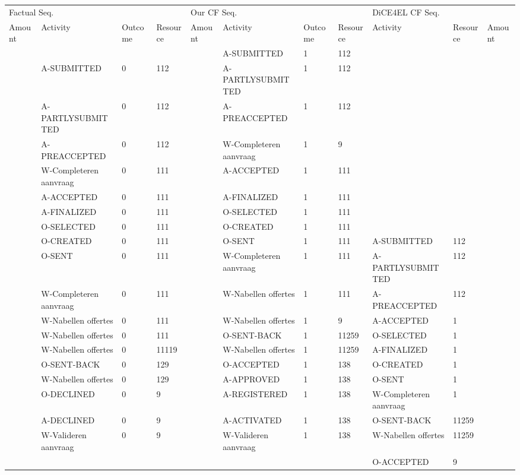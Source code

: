 \begin{tabular}{lllllllllll}
\toprule
\multicolumn{4}{l}{Factual Seq.} & \multicolumn{4}{l}{Our CF Seq.} & \multicolumn{3}{l}{DiCE4EL CF Seq.} \\
Amount & Activity & Outcome & Resource & Amount & Activity & Outcome & Resource & Activity & Resource & Amount \\
\midrule
 &  &  &  &  & A-SUBMITTED & 1 & 112 &  &  &  \\
 & A-SUBMITTED & 0 & 112 &  & A-PARTLYSUBMITTED & 1 & 112 &  &  &  \\
 & A-PARTLYSUBMITTED & 0 & 112 &  & A-PREACCEPTED & 1 & 112 &  &  &  \\
 & A-PREACCEPTED & 0 & 112 &  & W-Completeren aanvraag & 1 & 9 &  &  &  \\
 & W-Completeren aanvraag & 0 & 111 &  & A-ACCEPTED & 1 & 111 &  &  &  \\
 & A-ACCEPTED & 0 & 111 &  & A-FINALIZED & 1 & 111 &  &  &  \\
 & A-FINALIZED & 0 & 111 &  & O-SELECTED & 1 & 111 &  &  &  \\
 & O-SELECTED & 0 & 111 &  & O-CREATED & 1 & 111 &  &  &  \\
 & O-CREATED & 0 & 111 &  & O-SENT & 1 & 111 & A-SUBMITTED & 112 &  \\
 & O-SENT & 0 & 111 &  & W-Completeren aanvraag & 1 & 111 & A-PARTLYSUBMITTED & 112 &  \\
 & W-Completeren aanvraag & 0 & 111 &  & W-Nabellen offertes & 1 & 111 & A-PREACCEPTED & 112 &  \\
 & W-Nabellen offertes & 0 & 111 &  & W-Nabellen offertes & 1 & 9 & A-ACCEPTED & 1 &  \\
 & W-Nabellen offertes & 0 & 111 &  & O-SENT-BACK & 1 & 11259 & O-SELECTED & 1 &  \\
 & W-Nabellen offertes & 0 & 11119 &  & W-Nabellen offertes & 1 & 11259 & A-FINALIZED & 1 &  \\
 & O-SENT-BACK & 0 & 129 &  & O-ACCEPTED & 1 & 138 & O-CREATED & 1 &  \\
 & W-Nabellen offertes & 0 & 129 &  & A-APPROVED & 1 & 138 & O-SENT & 1 &  \\
 & O-DECLINED & 0 & 9 &  & A-REGISTERED & 1 & 138 & W-Completeren aanvraag & 1 &  \\
 & A-DECLINED & 0 & 9 &  & A-ACTIVATED & 1 & 138 & O-SENT-BACK & 11259 &  \\
 & W-Valideren aanvraag & 0 & 9 &  & W-Valideren aanvraag & 1 & 138 & W-Nabellen offertes & 11259 &  \\
 &  &  &  &  &  &  &  & O-ACCEPTED & 9 &  \\
\bottomrule
\end{tabular}
